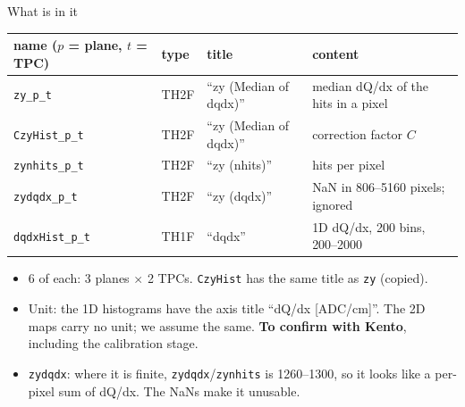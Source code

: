 \documentclass[aspectratio=169,10pt]{beamer}
\newcommand{\open}[1]{\textcolor{open}{\textbf{#1}}}
\newcommand{\code}[1]{\texttt{#1}}
\begin{document}
\begin{frame}{What is in it}
\centering\small
\begin{tabular}{@{}llll@{}}
\toprule
name ($p$ = plane, $t$ = TPC) & type & title & content \\
\midrule
\code{zy\_p\_t} & TH2F & ``zy (Median of dqdx)'' & median dQ/dx of the hits in a pixel \\
\code{CzyHist\_p\_t} & TH2F & ``zy (Median of dqdx)'' & correction factor $C$ \\
\code{zynhits\_p\_t} & TH2F & ``zy (nhits)'' & hits per pixel \\
\code{zydqdx\_p\_t} & TH2F & ``zy (dqdx)'' & NaN in 806--5160 pixels; ignored \\
\code{dqdxHist\_p\_t} & TH1F & ``dqdx'' & 1D dQ/dx, 200 bins, 200--2000 \\
\bottomrule
\end{tabular}
\raggedright
\vspace{4mm}
\begin{itemize}
\item 6 of each: 3 planes $\times$ 2 TPCs. \code{CzyHist} has the same title as \code{zy} (copied).
\item Unit: the 1D histograms have the axis title ``dQ/dx [ADC/cm]''. The 2D maps carry no unit; we assume the same. \open{To confirm with Kento}, including the calibration stage.
\item \code{zydqdx}: where it is finite, \code{zydqdx}/\code{zynhits} is 1260--1300, so it looks like a per-pixel sum of dQ/dx. The NaNs make it unusable.
\end{itemize}
\end{frame}
\end{document}
